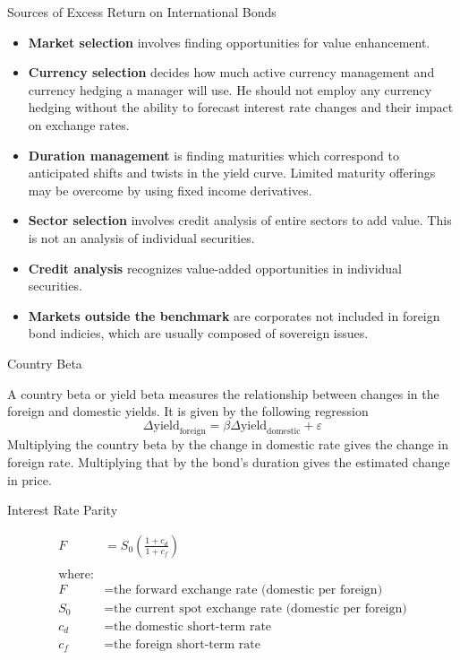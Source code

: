 \documentclass[../custom]{flashcards}
\begin{document}
\begin{flashcard}{Sources of Excess Return on International Bonds}
    \begin{itemize}
        \item \textbf{Market selection} involves finding opportunities for value enhancement.
        \item \textbf{Currency selection} decides how much active currency management and currency hedging a manager will use. He should not employ any currency hedging without the ability to forecast interest rate changes and their impact on exchange rates.
        \item \textbf{Duration management} is finding maturities which correspond to anticipated shifts and twists in the yield curve. Limited maturity offerings may be overcome by using fixed income derivatives.
        \item \textbf{Sector selection} involves credit analysis of entire sectors to add value. This is not an analysis of individual securities.
        \item \textbf{Credit analysis} recognizes value-added opportunities in individual securities.
        \item \textbf{Markets outside the benchmark} are corporates not included in foreign bond indicies, which are usually composed of sovereign issues.
    \end{itemize}
\end{flashcard}

\begin{flashcard}{Country Beta}
    \begin{flushleft}
        A country beta or yield beta measures the relationship between changes in the foreign and domestic yields. It is given by the following regression
        \[
            \Delta \text{yield}_\text{foreign} = \beta \Delta \text{yield}_\text{domestic} + \varepsilon
        \]
        Multiplying the country beta by the change in domestic rate gives the change in foreign rate. Multiplying that by the bond's duration gives the estimated change in price.
    \end{flushleft}
\end{flashcard}

\begin{flashcard}{Interest Rate Parity}
    \begin{flushleft}
        \begin{align*}
            F &= S_0 \left ( \frac{1 + c_d}{1 + c_f} \right )\\
            \\
            \text{where:}\\
            F &= \text{the forward exchange rate (domestic per foreign)}\\
            S_0 &= \text{the current spot exchange rate (domestic per foreign)}\\
            c_d &= \text{the domestic short-term rate}\\
            c_f &= \text{the foreign short-term rate}
        \end{align*}
    \end{flushleft}
\end{flashcard}
\end{document}
